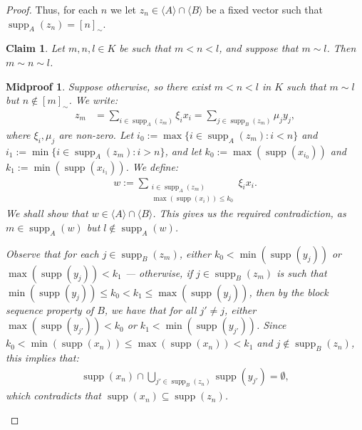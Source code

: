 \documentclass[10pt,a4paper]{amsart}
\newtheorem{claim}{Claim}
\newtheorem{midproof}{Midproof}
\renewcommand{\c}[1]{\langle #1 \rangle}
\newcommand{\func}{\operatorname}
\newcommand{\supp}{\func{supp}}
\begin{document}
\begin{proof}
    Thus, for each $n$ we let $z_n \in \c{A} \cap \c{B}$ be a fixed vector such that $\supp_A(z_n) = [n]_\sim$. 

    \begin{claim}
    \label{claim:eq.classes.are.blocks}
        Let $m,n,l \in K$ be such that $m < n < l$, and suppose that $m \sim l$. Then $m \sim n \sim l$.
    \end{claim}

    \begin{midproof}
        Suppose otherwise, so there exist $m < n < l$ in $K$ such that $m \sim l$ but $n \notin [m]_\sim$. We write:
        \begin{align*}
            z_m &= \sum_{i \in \supp_A(z_m)} \xi_ix_i = \sum_{j \in \supp_B(z_m)} \mu_jy_j,
        \end{align*} 
        where $\xi_i,\mu_j$ are non-zero. Let $i_0 := \max\{i \in \supp_A(z_m) : i < n\}$ and $i_1 := \min\{i \in \supp_A(z_m) : i > n\}$, and let $k_0 := \max(\supp(x_{i_0}))$ and $k_1 := \min(\supp(x_{i_1}))$. We define:
        \begin{align*}
            w := \sum_{\substack{i \in \supp_A(z_m) \\ \max(\supp(x_i)) \leq k_0}} \xi_ix_i.
        \end{align*}
        We shall show that $w \in \c{A} \cap \c{B}$. This gives us the required contradiction, as $m \in \supp_A(w)$ but $l \not\in \supp_A(w)$. 

        Observe that for each $j \in \supp_B(z_m)$, either $k_0 < \min(\supp(y_j))$ or $\max(\supp(y_j)) < k_1$ --- otherwise, if $j \in \supp_B(z_m)$ is such that $\min(\supp(y_j)) \leq k_0 < k_1 \leq \max(\supp(y_j))$, then by the block sequence property of $B$, we have that for all $j' \neq j$, either $\max(\supp(y_{j'})) < k_0$ or $k_1 < \min(\supp(y_{j'}))$. Since $k_0 < \min(\supp(x_n)) \leq \max(\supp(x_n)) < k_1$ and $j \notin \supp_B(z_n)$, this implies that:
        \begin{align*}
            \supp(x_n) \cap \bigcup_{j' \in \supp_B(z_n)} \supp(y_{j'}) = \emptyset,
        \end{align*}
        which contradicts that $\supp(x_n) \subseteq \supp(z_n)$. 


\end{midproof}
\end{proof}
\end{document}
